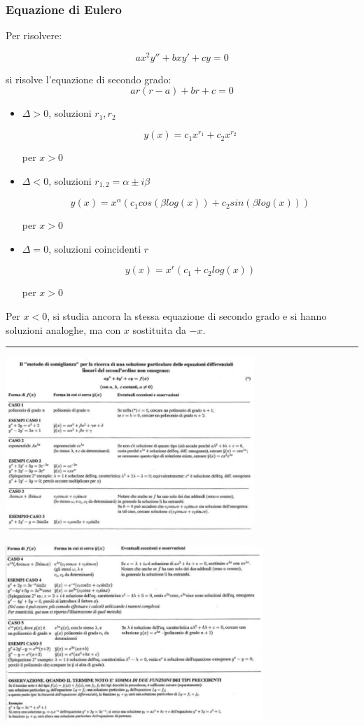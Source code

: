 \subsubsection{Equazione di Eulero}
Per risolvere:
\begin{tcolorbox}
\[
    ax^2y''+bxy'+cy= 0
\]
\end{tcolorbox}
si risolve l'equazione di secondo grado:
\[
    ar(r-a)+br+c = 0
\]
\begin{itemize}
    \item $\Delta >0$, soluzioni $r_1, r_2$
    \begin{tcolorbox}
    \[
        y(x) =c_1x^{r_1}+c_2x^{r_2}
    \]
    \end{tcolorbox}
    per $x>0$
    \item $\Delta <0$, soluzioni $r_{1,2} = \alpha \pm i \beta$
    \begin{tcolorbox}
    \[
        y(x) = x^{\alpha}(c_1 cos(\beta log(x)) + c_2 sin(\beta log(x)))
    \]
    \end{tcolorbox}
    per $x>0$
    \item $\Delta = 0$, soluzioni coincidenti $r$
    \begin{tcolorbox}
    \[
        y(x) = x^r(c_1 + c_2log(x))
    \]
    \end{tcolorbox}
    per $x>0$
\end{itemize}
Per $x<0$, si studia ancora la stessa equazione di secondo grado e si hanno soluzioni analoghe, ma con $x$ sostituita da $-x$.\newline
\rule{\textwidth}{0,4pt}\newline
\begin{tcolorbox}
\begin{center}
    \includegraphics[height=250px]{../img/eqdiff2.PNG}
\end{center}
\begin{center}
    \includegraphics[height=250px]{../img/eqdiff2(1).PNG}
\end{center}
\end{tcolorbox}
